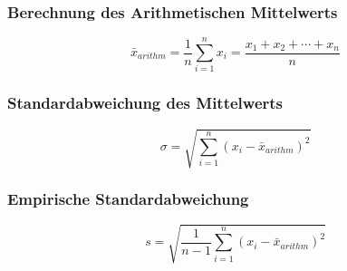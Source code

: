 \subsubsection{Berechnung des Arithmetischen Mittelwerts}
\begin{equation}
    \bar{x}_{arithm} = \frac{1}{n}  \sum_{i=1}^n x_i = \frac{x_1 + x_2 + \cdots + x_n}{n}
    \label{eqn:6}
\end{equation}

\subsubsection{Standardabweichung des Mittelwerts}
\begin{equation}
    \sigma = \sqrt{\sum_{i=1}^n (x_i - \bar{x}_{arithm})^2}
    \label{eqn:7}
\end{equation}
\subsubsection{Empirische Standardabweichung}
\begin{equation}
    s = \sqrt{\frac{1}{n - 1} \sum_{i=1}^n (x_i - \bar{x}_{arithm})^2}
    \label{eqn:8}
\end{equation}
